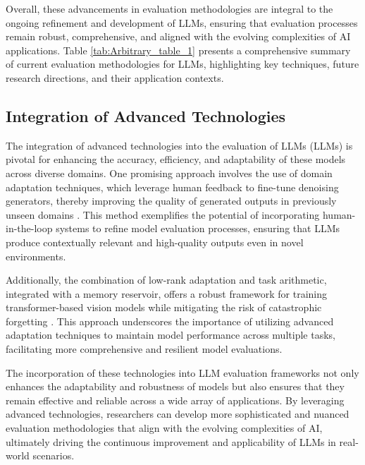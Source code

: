 Overall, these advancements in evaluation methodologies are integral to the ongoing refinement and development of LLMs, ensuring that evaluation processes remain robust, comprehensive, and aligned with the evolving complexities of AI applications. Table \ref{tab:Arbitrary_table_1} presents a comprehensive summary of current evaluation methodologies for LLMs, highlighting key techniques, future research directions, and their application contexts.



\subsection{Integration of Advanced Technologies} \label{subsec:Integration of Advanced Technologies}



The integration of advanced technologies into the evaluation of LLMs (LLMs) is pivotal for enhancing the accuracy, efficiency, and adaptability of these models across diverse domains. One promising approach involves the use of domain adaptation techniques, which leverage human feedback to fine-tune denoising generators, thereby improving the quality of generated outputs in previously unseen domains \cite{park2023domainadaptationbasedhuman}. This method exemplifies the potential of incorporating human-in-the-loop systems to refine model evaluation processes, ensuring that LLMs produce contextually relevant and high-quality outputs even in novel environments.



Additionally, the combination of low-rank adaptation and task arithmetic, integrated with a memory reservoir, offers a robust framework for training transformer-based vision models while mitigating the risk of catastrophic forgetting \cite{chitale2023taskarithmeticloracontinual}. This approach underscores the importance of utilizing advanced adaptation techniques to maintain model performance across multiple tasks, facilitating more comprehensive and resilient model evaluations.



The incorporation of these technologies into LLM evaluation frameworks not only enhances the adaptability and robustness of models but also ensures that they remain effective and reliable across a wide array of applications. By leveraging advanced technologies, researchers can develop more sophisticated and nuanced evaluation methodologies that align with the evolving complexities of AI, ultimately driving the continuous improvement and applicability of LLMs in real-world scenarios.



